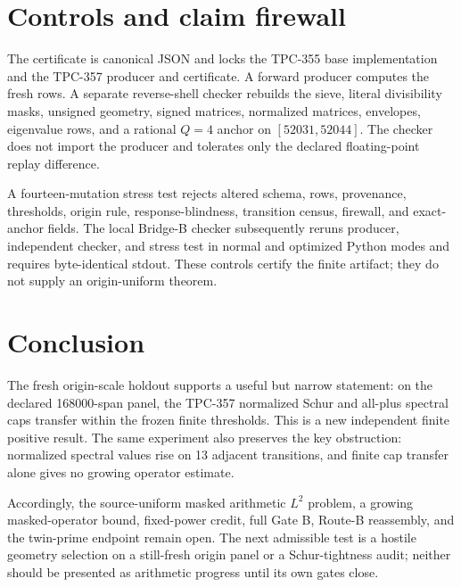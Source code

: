 \documentclass[10pt]{article}
\begin{document}
\section{Controls and claim firewall}

The certificate is canonical JSON and locks the TPC-355 base implementation
and the TPC-357 producer and certificate.  A forward producer computes the
fresh rows.  A separate reverse-shell checker rebuilds the sieve, literal
divisibility masks, unsigned geometry, signed matrices, normalized matrices,
envelopes, eigenvalue rows, and a rational $Q=4$ anchor on
$[52031,52044]$.  The checker does not import the producer and tolerates only
the declared floating-point replay difference.

A fourteen-mutation stress test rejects altered schema, rows, provenance,
thresholds, origin rule, response-blindness, transition census, firewall, and
exact-anchor fields.  The local Bridge-B checker subsequently reruns producer,
independent checker, and stress test in normal and optimized Python modes and
requires byte-identical stdout.  These controls certify the finite artifact;
they do not supply an origin-uniform theorem.

\section{Conclusion}

The fresh origin-scale holdout supports a useful but narrow statement: on the
declared 168000-span panel, the TPC-357 normalized Schur and all-plus spectral
caps transfer within the frozen finite thresholds.  This is a new independent
finite positive result.  The same experiment also preserves the key
obstruction: normalized spectral values rise on 13 adjacent transitions, and
finite cap transfer alone gives no growing operator estimate.

Accordingly, the source-uniform masked arithmetic $L^2$ problem, a growing
masked-operator bound, fixed-power credit, full Gate B, Route-B reassembly, and
the twin-prime endpoint remain open.  The next admissible test is a hostile
geometry selection on a still-fresh origin panel or a Schur-tightness audit;
neither should be presented as arithmetic progress until its own gates close.

\nocite{tpc356}


\end{document}
